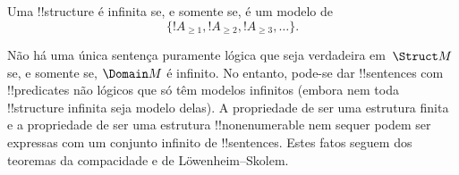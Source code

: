 \documentclass[../../../include/open-logic-section]{subfiles}
\begin{document}
\begin{prop}
Uma !!{structure} é infinita se, e somente se, é um modelo de
\[
\{!A_{\ge 1}, !A_{\ge 2}, !A_{\ge 3}, \dots \}.
\]
\end{prop}

Não há uma única sentença puramente lógica que seja verdadeira
em~$\Struct M$ se, e somente se, $\Domain M$ é infinito.  No entanto,
pode-se dar !!{sentence}s com !!{predicate}s não lógicos que só têm
modelos infinitos (embora nem toda !!{structure} infinita seja modelo
delas).  A propriedade de ser uma estrutura finita e a propriedade de
ser uma estrutura !!{nonenumerable} nem sequer podem ser expressas com
um conjunto infinito de !!{sentence}s.  Estes fatos seguem dos
teoremas da compacidade e de L\"owenheim--Skolem.
\end{document}
